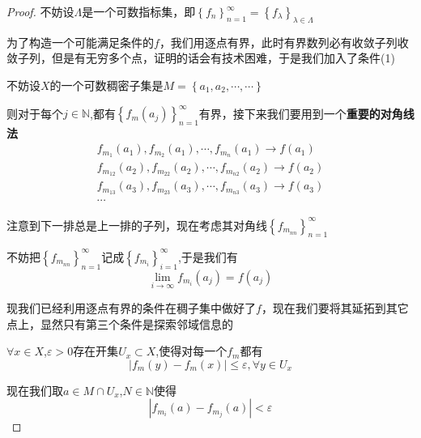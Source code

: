 \documentclass[lang=cn,10pt]{elegantbook}
\begin{document}
	\begin{proof}
		
		不妨设$\varLambda$是一个可数指标集，即$\left\{ f_n \right\} _{n=1}^{\infty}= \left\{ f_{\lambda} \right\} _{\lambda \in \varLambda}$
		
		为了构造一个可能满足条件的$f$，我们用逐点有界，此时有界数列必有收敛子列收敛子列，但是有无穷多个点，证明的话会有技术困难，于是我们加入了条件(1)
		
		不妨设$X$的一个可数稠密子集是$M=\left\{ a_1,a_2,\cdots ,\cdots \right\} $
		
		则对于每个$j\in \mathbb{N}$,都有$\left\{ f_{m}(a_{j}) \right\} _{n=1}^{\infty}$有界，接下来我们要用到一个\textbf{重要的对角线法}
		\begin{equation*}
			\begin{aligned}
				f_{m_1}\left( a_1 \right) ,f_{m_2}\left( a_1 \right) ,\cdots ,f_{m_n}\left( a_1 \right) \rightarrow f\left( a_1 \right) 
				\\
				f_{m_{12}}\left( a_2 \right) ,f_{m_{22}}\left( a_2 \right) ,\cdots ,f_{m_{n2}}\left( a_2 \right) \rightarrow f\left( a_2 \right) 
				\\
				f_{m_{13}}\left( a_3 \right) ,f_{m_{23}}\left( a_3 \right) ,\cdots ,f_{m_{n3}}\left( a_3 \right) \rightarrow f\left( a_3 \right) 
				\\
				\cdots 
			\end{aligned}
		\end{equation*}
		
		注意到下一排总是上一排的子列，现在考虑其对角线$\left\{ f_{m_{nn}} \right\} _{n=1}^{\infty}$
		
		不妨把$\left\{ f_{m_{nn}} \right\} _{n=1}^{\infty}$记成$\left\{ f_{m_{i}} \right\} _{i=1}^{\infty}$,于是我们有
		\begin{equation*}
			\lim_{i\rightarrow \infty} f_{m_i}\left( a_j \right) =f\left( a_j \right) 
		\end{equation*}
		
		现我们已经利用逐点有界的条件在稠子集中做好了$f$，现在我们要将其延拓到其它点上，显然只有第三个条件是探索邻域信息的
		
		$\forall x\in X$,$\varepsilon >0$存在开集$U_{x}\subset X $,使得对每一个$f_{m}$都有
		\begin{equation*}
			|f_{m}(y)-f_{m}(x)|\le\varepsilon,\forall y\in U_{x}
		\end{equation*}
		
		现在我们取$a\in M\cap U_{x}$,$N\in \mathbb{N}$使得
		\begin{equation*}
			|f_{m_{i}}(a)-f_{m_{j}}(a)|<\varepsilon
		\end{equation*}
		

\end{proof}
\end{document}
